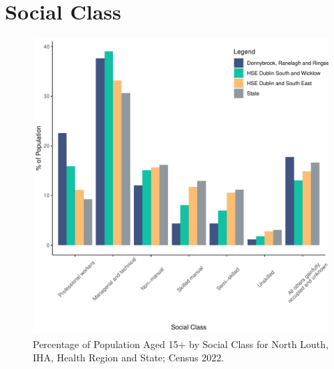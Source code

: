 \documentclass{article}
\begin{document}
\section{Social Class}\label{sect:SC}
\begin{figure}[H]
	\centering
	\includegraphics[width = 140mm]{../figures/SocialClassED.pdf}
	\caption{Percentage of Population Aged 15+ by Social Class for North Louth, IHA, Health Region and State; Census 2022.}
	\label{fig:vbnv}
	\end{figure}
\end{document}
